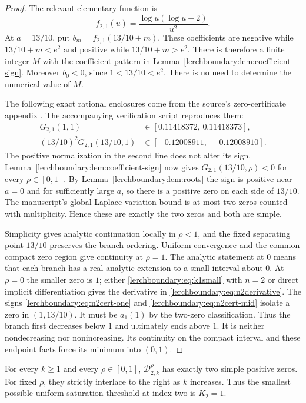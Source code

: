 \begin{proof}
The relevant elementary function is
\[
 f_{2,1}(u)=\frac{\log u(\log u-2)}{u^2}.
\]
At $a=13/10$, put $b_m=f_{2,1}(13/10+m)$.
These coefficients are negative while $13/10+m<e^2$ and positive
while $13/10+m>e^2$.  There is therefore a finite integer $M$ with
the coefficient pattern in Lemma~\ref{lerchboundary:lem:coefficient-sign}.
Moreover $b_0<0$, since $1<13/10<e^2$.  There is no need to determine
the numerical value of $M$.

The following exact rational enclosures come from the source's
zero-certificate appendix \cite{ProveItSnapshot}. The accompanying
verification script reproduces them:
\begin{align}
 G_{2,1}(1,1)&\in[0.11418372,\,0.11418373],
 \label{lerchboundary:eq:n2cert-one}\\
 (13/10)^2G_{2,1}(13/10,1)
 &\in[-0.12008911,\,-0.12008910].
 \label{lerchboundary:eq:n2cert-mid}
\end{align}
The positive normalization in the second line does not alter its sign.
Lemma~\ref{lerchboundary:lem:coefficient-sign} now gives
$G_{2,1}(13/10,\rho)<0$ for every $\rho\in[0,1]$.
By Lemma~\ref{lerchboundary:lem:roots} the sign is positive near
$a=0$ and for sufficiently large $a$, so there is a positive zero
on each side of $13/10$. The manuscript's global Laplace variation
bound is at most two zeros counted with multiplicity. Hence these
are exactly the two zeros and both are simple.

Simplicity gives analytic continuation locally in $\rho<1$, and the
fixed separating point $13/10$ preserves the branch ordering.
Uniform convergence and the common compact zero region give continuity
at $\rho=1$. The analytic statement at $0$ means that each branch has
a real analytic extension to a small interval about $0$.
At $\rho=0$ the smaller zero is $1$; either
\eqref{lerchboundary:eq:k1small} with $n=2$ or direct implicit
differentiation gives the derivative in \eqref{lerchboundary:eq:n2derivative}.
The signs \eqref{lerchboundary:eq:n2cert-one} and
\eqref{lerchboundary:eq:n2cert-mid} isolate a zero in $(1,13/10)$.
It must be $a_1(1)$ by the two-zero classification. Thus the branch
first decreases below $1$ and ultimately ends above $1$.  It is neither
nondecreasing nor nonincreasing. Its continuity on the compact interval
and these endpoint facts force its minimum into $(0,1)$.
\end{proof}

\begin{corollary}
\label{lerchboundary:cor:n2allk}
For every $k\geq1$ and every $\rho\in[0,1]$,
$\mathcal D_{2,k}^{\rho}$ has exactly two simple positive zeros.
For fixed $\rho$, they strictly interlace to the right as $k$ increases.
Thus the smallest possible uniform saturation threshold at index two
is $K_2=1$.
\end{corollary}

